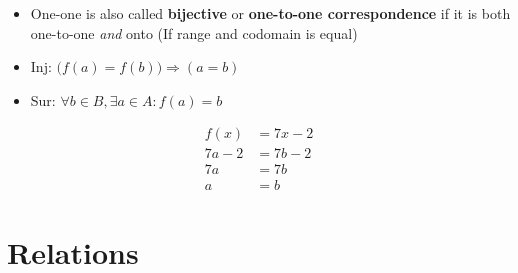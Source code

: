 \documentclass[english,10pt,a4paper]{article}
\begin{document}
\begin{theo}[Bijective] 
\begin{minipage}{0.7\linewidth}
\begin{itemize}
\item One-one is also called \textbf{bijective} or \textbf{one-to-one correspondence} if it is both one-to-one \textit{and} onto (If range and codomain is equal)
\item Inj: $\big(f(a) = f(b)\big) \Rightarrow (a=b)$
\item Sur: $\forall b \in B, \exists a \in A: f(a)=b$
\end{itemize}
\end{minipage}
\hspace{0.1cm}
\begin{minipage}{0.25\linewidth}
\begin{align*}
f(x) &= 7x-2\\
7a-2 &= 7b-2\\
7a &= 7b\\
a &= b
\end{align*}
\end{minipage}
\end{theo}



\newpage
\section{Relations}
\end{document}
